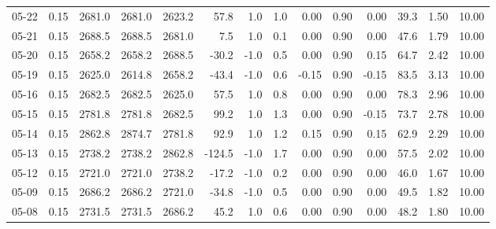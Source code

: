 \begin{threeparttable}
{\begin{tabular}{lrrrrrrrrrrrrr}
  05-22 &     0.15 & 2681.0 & 2681.0 & 2623.2 &       57.8 &                      1.0 &                 1.0 &       0.00 &      0.90 &           0.00 &             39.3 &            1.50 &                  10.00 \\
  05-21 &     0.15 & 2688.5 & 2688.5 & 2681.0 &        7.5 &                      1.0 &                 0.1 &       0.00 &      0.90 &           0.00 &             47.6 &            1.79 &                  10.00 \\
  05-20 &     0.15 & 2658.2 & 2658.2 & 2688.5 &      -30.2 &                     -1.0 &                 0.5 &       0.00 &      0.90 &           0.15 &             64.7 &            2.42 &                  10.00 \\
  05-19 &     0.15 & 2625.0 & 2614.8 & 2658.2 &      -43.4 &                     -1.0 &                 0.6 &      -0.15 &      0.90 &          -0.15 &             83.5 &            3.13 &                  10.00 \\
  05-16 &     0.15 & 2682.5 & 2682.5 & 2625.0 &       57.5 &                      1.0 &                 0.8 &       0.00 &      0.90 &           0.00 &             78.3 &            2.96 &                  10.00 \\
  05-15 &     0.15 & 2781.8 & 2781.8 & 2682.5 &       99.2 &                      1.0 &                 1.3 &       0.00 &      0.90 &          -0.15 &             73.7 &            2.78 &                  10.00 \\
  05-14 &     0.15 & 2862.8 & 2874.7 & 2781.8 &       92.9 &                      1.0 &                 1.2 &       0.15 &      0.90 &           0.15 &             62.9 &            2.29 &                  10.00 \\
  05-13 &     0.15 & 2738.2 & 2738.2 & 2862.8 &     -124.5 &                     -1.0 &                 1.7 &       0.00 &      0.90 &           0.00 &             57.5 &            2.02 &                  10.00 \\
  05-12 &     0.15 & 2721.0 & 2721.0 & 2738.2 &      -17.2 &                     -1.0 &                 0.2 &       0.00 &      0.90 &           0.00 &             46.0 &            1.67 &                  10.00 \\
  05-09 &     0.15 & 2686.2 & 2686.2 & 2721.0 &      -34.8 &                     -1.0 &                 0.5 &       0.00 &      0.90 &           0.00 &             49.5 &            1.82 &                  10.00 \\
  05-08 &     0.15 & 2731.5 & 2731.5 & 2686.2 &       45.2 &                      1.0 &                 0.6 &       0.00 &      0.90 &           0.00 &             48.2 &            1.80 &                  10.00 \\

\end{tabular}}
\end{threeparttable}
